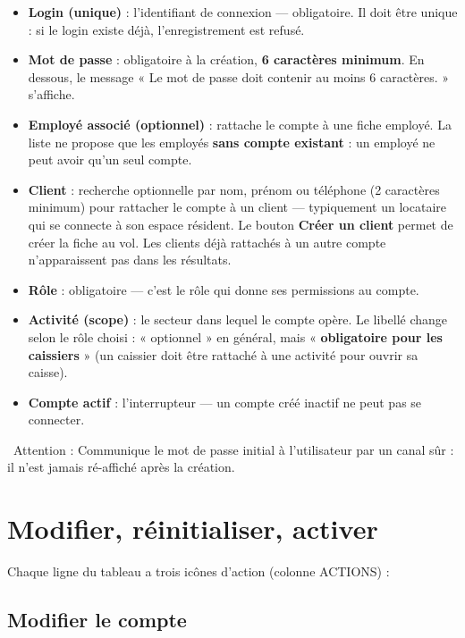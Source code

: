 \documentclass[12pt,a4paper]{article}
\newcommand{\attention}[1]{\par\noindent\textcolor{warn}{\faExclamationTriangle\ Attention : #1}\par}
\begin{document}
\begin{itemize}[label=\textcolor{lagoon}{\faEdit}]
  \item \textbf{Login (unique)} : l'identifiant de connexion — obligatoire. Il doit être unique : si le login existe déjà, l'enregistrement est refusé.
  \item \textbf{Mot de passe} : obligatoire à la création, \textbf{6 caractères minimum}. En dessous, le message « Le mot de passe doit contenir au moins 6 caractères. » s'affiche.
  \item \textbf{Employé associé (optionnel)} : rattache le compte à une fiche employé. La liste ne propose que les employés \textbf{sans compte existant} : un employé ne peut avoir qu'un seul compte.
  \item \textbf{Client} : recherche optionnelle par nom, prénom ou téléphone (2 caractères minimum) pour rattacher le compte à un client — typiquement un locataire qui se connecte à son espace résident. Le bouton \textbf{Créer un client} permet de créer la fiche au vol. Les clients déjà rattachés à un autre compte n'apparaissent pas dans les résultats.
  \item \textbf{Rôle} : obligatoire — c'est le rôle qui donne ses permissions au compte.
  \item \textbf{Activité (scope)} : le secteur dans lequel le compte opère. Le libellé change selon le rôle choisi : « optionnel » en général, mais « \textbf{obligatoire pour les caissiers} » (un caissier doit être rattaché à une activité pour ouvrir sa caisse).
  \item \textbf{Compte actif} : l'interrupteur — un compte créé inactif ne peut pas se connecter.
\end{itemize}

\attention{Communique le mot de passe initial à l'utilisateur par un canal sûr : il n'est jamais ré-affiché après la création.}

\newpage

\section{Modifier, réinitialiser, activer}\label{sec:actions-utilisateur}

Chaque ligne du tableau a trois icônes d'action (colonne ACTIONS) :

\subsection{Modifier le compte}
\end{document}
